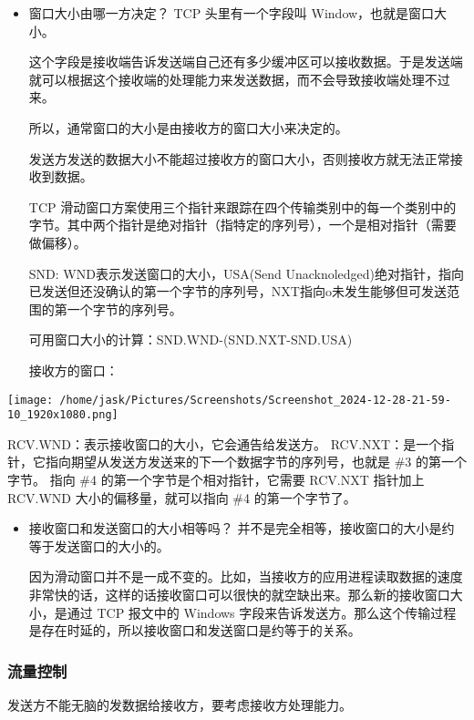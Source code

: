 \documentclass[11pt]{article}
\begin{document}
\begin{itemize}
\item 窗口大小由哪一方决定？
TCP 头里有一个字段叫 Window，也就是窗口大小。

这个字段是接收端告诉发送端自己还有多少缓冲区可以接收数据。于是发送端就可以根据这个接收端的处理能力来发送数据，而不会导致接收端处理不过来。

所以，通常窗口的大小是由接收方的窗口大小来决定的。

发送方发送的数据大小不能超过接收方的窗口大小，否则接收方就无法正常接收到数据。

TCP 滑动窗口方案使用三个指针来跟踪在四个传输类别中的每一个类别中的字节。其中两个指针是绝对指针（指特定的序列号），一个是相对指针（需要做偏移）。

SND: WND表示发送窗口的大小，USA(Send Unacknoledged)绝对指针，指向已发送但还没确认的第一个字节的序列号，NXT指向o未发生能够但可发送范围的第一个字节的序列号。

可用窗口大小的计算：SND.WND-(SND.NXT-SND.USA)

接收方的窗口：
\end{itemize}

\begin{center}
\texttt{[image: /home/jask/Pictures/Screenshots/Screenshot\_2024-12-28-21-59-10\_1920x1080.png]}
\end{center}
   RCV.WND：表示接收窗口的大小，它会通告给发送方。
   RCV.NXT：是一个指针，它指向期望从发送方发送来的下一个数据字节的序列号，也就是 \#3 的第一个字节。
   指向 \#4 的第一个字节是个相对指针，它需要 RCV.NXT 指针加上 RCV.WND 大小的偏移量，就可以指向 \#4 的第一个字节了。

\begin{itemize}
\item 接收窗口和发送窗口的大小相等吗？
并不是完全相等，接收窗口的大小是约等于发送窗口的大小的。

因为滑动窗口并不是一成不变的。比如，当接收方的应用进程读取数据的速度非常快的话，这样的话接收窗口可以很快的就空缺出来。那么新的接收窗口大小，是通过 TCP 报文中的 Windows 字段来告诉发送方。那么这个传输过程是存在时延的，所以接收窗口和发送窗口是约等于的关系。
\end{itemize}
\subsubsection{流量控制}
\label{sec:org941e41d}

发送方不能无脑的发数据给接收方，要考虑接收方处理能力。
\end{document}
